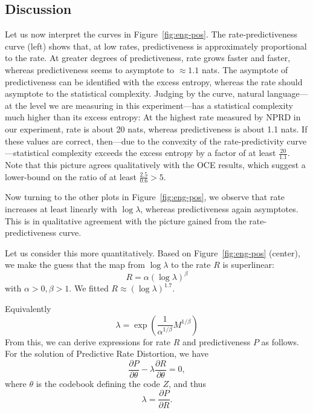 \documentclass[11pt,letterpaper]{article}
\newif \ifcomment
\newcommand\rljf[1]{\ifcomment{{\color{blue}(#1)}}\else{}\fi}
\begin{document}
\subsection{Discussion}
Let us now interpret the curves in Figure~\ref{fig:eng-pos}. \rljf{What is predictiveness? Excess entropy?}
The rate-predictiveness curve (left) shows that, at low rates, predictiveness is approximately proportional to the rate.
At greater degrees of predictiveness, rate grows faster and faster, whereas predictiveness seems to asymptote to $\approx 1.1$ nats.
The asymptote of predictiveness can be identified with the excess entropy, whereas the rate should asymptote to the statistical complexity.
Judging by the curve, natural language---at the level we are measuring in this experiment---has a statistical complexity much higher than its excess entropy:
At the highest rate measured by NPRD in our experiment, rate is about 20 nats, whereas predictiveness is about 1.1 nats.
If these values are correct, then---due to the convexity of the rate-predictivity curve---statistical complexity exceeds the excess entropy by a factor of at least $\frac{20}{1.1}$. \rljf{Wow, is this true for any other natural processes?}
Note that this picture agrees qualitatively with the OCE results, which suggest a lower-bound on the ratio of at least $\frac{2.5}{0.6} > 5$.

Now turning to the other plots in Figure~\ref{fig:eng-pos}, we observe that rate increases at least linearly with $\log\lambda$, whereas predictiveness again asymptotes.
This is in qualitative agreement with the picture gained from the rate-predictiveness curve.


Let us consider this more quantitatively.
Based on Figure~\ref{fig:eng-pos} (center), we make the guess that the map from $\log\lambda$ to the rate $R$ is superlinear:
\rljf{Was there a change of variables between $\beta$ and $\lambda$ here?}
\begin{equation}
	R = \alpha (\log\lambda)^\beta
\end{equation}
	with $\alpha>0, \beta>1$.
We fitted $R \approx (\log\lambda)^{1.7}$.

Equivalently
\begin{equation}
\lambda = \exp\left(\frac{1}{\alpha^{1/\beta}} M^{1/\beta}\right)
\end{equation}
From this, we can derive expressions for rate $R$ and predictiveness $P$ as follows.
For the solution of Predictive Rate Distortion, we have
\begin{equation}
	\frac{\partial P}{\partial \theta} - \lambda \frac{\partial R}{\partial \theta} = 0,
\end{equation}
where $\theta$ is the codebook defining the code $Z$, and thus
\begin{equation}
\lambda =	\frac{\partial P}{\partial R}.
\end{equation}
\end{document}
